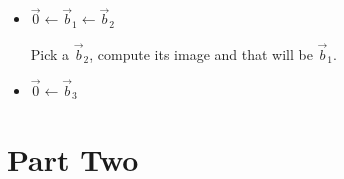 \documentclass[11pt,fleqn]{book} %
\begin{document}
\begin{example}
    \begin{itemize}
        \item $\vec{0} \leftarrow \vec{b}_1 \leftarrow \vec{b}_2$
            
        Pick a $\vec{b}_2$, compute its image and that will be $\vec{b}_1$. 
            
        \item $\vec{0} \leftarrow \vec{b}_3$
    \end{itemize}
\end{example}


\part{Part Two}






\end{document}
